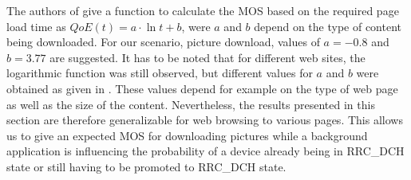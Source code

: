 The authors of \cite{egger2012a} give a function to calculate the \gls{MOS} based on the required page load time as \(QoE(t) = a\cdot \ln t + b\), were \(a\) and \(b\) depend on the type of content being downloaded.
For our scenario, picture download, values of \(a = -0.8\) and \(b = 3.77\) are suggested.
It has to be noted that for different web sites, the logarithmic function was still observed, but different values for \(a\) and \(b\) were obtained as given in \cite{egger2012a}.
These values depend for example on the type of web page as well as the size of the content.
Nevertheless, the results presented in this section are therefore generalizable for web browsing to various pages.
This allows us to give an expected \gls{MOS} for downloading pictures while a background application is influencing the probability of a device already being in \gls{RRC_DCH} state or still having to be promoted to \gls{RRC_DCH} state.

